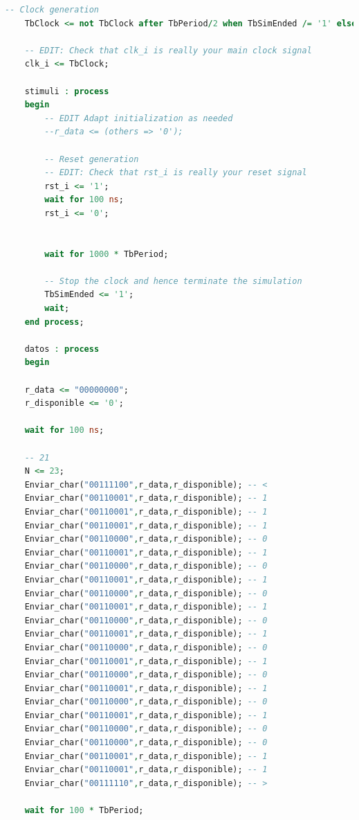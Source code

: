 \begin{lstlisting}[language = vhdl,caption=Testbench del módulo detector,label={lst:test_detector}]
    -- Clock generation
    TbClock <= not TbClock after TbPeriod/2 when TbSimEnded /= '1' else '0';

    -- EDIT: Check that clk_i is really your main clock signal
    clk_i <= TbClock;

    stimuli : process
    begin
        -- EDIT Adapt initialization as needed
        --r_data <= (others => '0');

        -- Reset generation
        -- EDIT: Check that rst_i is really your reset signal
        rst_i <= '1';
        wait for 100 ns;
        rst_i <= '0';

	
        wait for 1000 * TbPeriod;

        -- Stop the clock and hence terminate the simulation
        TbSimEnded <= '1';
        wait;
    end process;

    datos : process
    begin
        
	r_data <= "00000000";
	r_disponible <= '0';

	wait for 100 ns;

	-- 21
	N <= 23; 	
	Enviar_char("00111100",r_data,r_disponible); -- < 	
	Enviar_char("00110001",r_data,r_disponible); -- 1 	
	Enviar_char("00110001",r_data,r_disponible); -- 1
 	Enviar_char("00110001",r_data,r_disponible); -- 1 	
	Enviar_char("00110000",r_data,r_disponible); -- 0
	Enviar_char("00110001",r_data,r_disponible); -- 1 	
	Enviar_char("00110000",r_data,r_disponible); -- 0
	Enviar_char("00110001",r_data,r_disponible); -- 1 	
	Enviar_char("00110000",r_data,r_disponible); -- 0
	Enviar_char("00110001",r_data,r_disponible); -- 1 	
	Enviar_char("00110000",r_data,r_disponible); -- 0
	Enviar_char("00110001",r_data,r_disponible); -- 1 	
	Enviar_char("00110000",r_data,r_disponible); -- 0
	Enviar_char("00110001",r_data,r_disponible); -- 1 	
	Enviar_char("00110000",r_data,r_disponible); -- 0
	Enviar_char("00110001",r_data,r_disponible); -- 1 	
	Enviar_char("00110000",r_data,r_disponible); -- 0
	Enviar_char("00110001",r_data,r_disponible); -- 1 	
	Enviar_char("00110000",r_data,r_disponible); -- 0
	Enviar_char("00110000",r_data,r_disponible); -- 0 	
	Enviar_char("00110001",r_data,r_disponible); -- 1
	Enviar_char("00110001",r_data,r_disponible); -- 1 	
	Enviar_char("00111110",r_data,r_disponible); -- >

	wait for 100 * TbPeriod;


\end{lstlisting}
